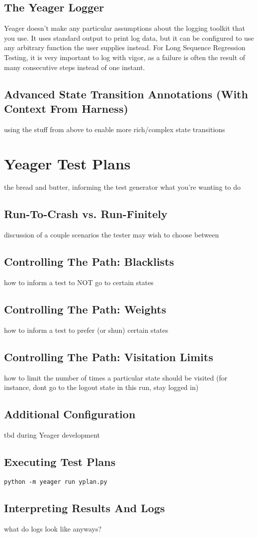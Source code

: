\subsection{The Yeager Logger}
Yeager doesn't make any particular assumptions about the logging toolkit that you use. It uses standard output to print log data, but it can be configured to use any arbitrary function the user supplies instead. For Long Sequence Regression Testing, it is very important to log with vigor, as a failure is often the result of many consecutive steps instead of one instant. %

\subsection{Advanced State Transition Annotations (With Context From Harness)}
using the stuff from above to enable more rich/complex state transitions %

\section{Yeager Test Plans}
the bread and butter, informing the test generator what you're wanting to do %

\subsection{Run-To-Crash vs. Run-Finitely}
discussion of a couple scenarios the tester may wish to choose between %

\subsection{Controlling The Path: Blacklists}
how to inform a test to NOT go to certain states %

\subsection{Controlling The Path: Weights}
how to inform a test to prefer (or shun) certain states %

\subsection{Controlling The Path: Visitation Limits}
how to limit the number of times a particular state should be visited (for instance, dont go to the logout state in this run, stay logged in) %

\subsection{Additional Configuration}
tbd during Yeager development %

\subsection{Executing Test Plans}
\texttt{python -m yeager run yplan.py} %

\subsection{Interpreting Results And Logs}
what do logs look like anyways? %
